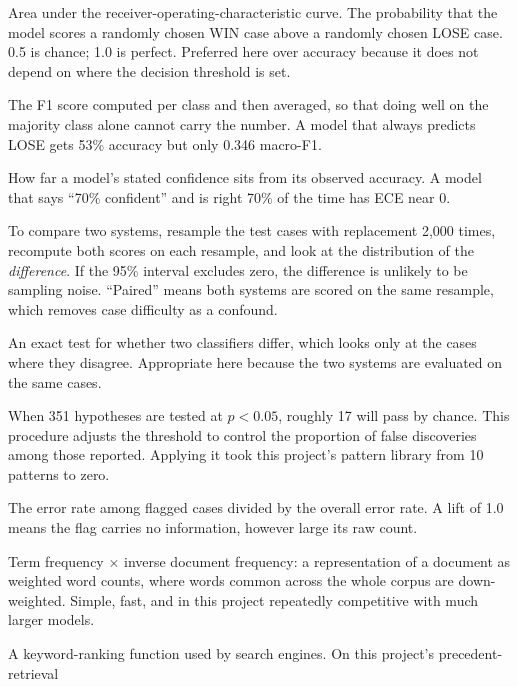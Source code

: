 \documentclass[12pt,a4paper]{article}
\begin{document}
\begin{description}[leftmargin=0pt,style=nextline,itemsep=3pt]
\item[AUROC] Area under the receiver-operating-characteristic curve. The probability that the model
scores a randomly chosen WIN case above a randomly chosen LOSE case. 0.5 is chance; 1.0 is perfect.
Preferred here over accuracy because it does not depend on where the decision threshold is set.
\item[Macro-F1] The F1 score computed per class and then averaged, so that doing well on the
majority class alone cannot carry the number. A model that always predicts LOSE gets 53\% accuracy
but only 0.346 macro-F1.
\item[ECE (expected calibration error)] How far a model's stated confidence sits from its observed
accuracy. A model that says ``70\% confident'' and is right 70\% of the time has ECE near 0.
\item[Paired bootstrap] To compare two systems, resample the test cases with replacement 2,000
times, recompute both scores on each resample, and look at the distribution of the \emph{difference}.
If the 95\% interval excludes zero, the difference is unlikely to be sampling noise. ``Paired'' means
both systems are scored on the same resample, which removes case difficulty as a confound.
\item[McNemar's test] An exact test for whether two classifiers differ, which looks only at the cases
where they disagree. Appropriate here because the two systems are evaluated on the same cases.
\item[Benjamini--Hochberg correction] When 351 hypotheses are tested at $p<0.05$, roughly 17 will pass
by chance. This procedure adjusts the threshold to control the proportion of false discoveries among
those reported. Applying it took this project's pattern library from 10 patterns to zero.
\item[Lift (base-rate control)] The error rate among flagged cases divided by the overall error rate.
A lift of 1.0 means the flag carries no information, however large its raw count.
\item[TF-IDF] Term frequency $\times$ inverse document frequency: a representation of a document as
weighted word counts, where words common across the whole corpus are down-weighted. Simple, fast,
and in this project repeatedly competitive with much larger models.
\item[BM25] A keyword-ranking function used by search engines. On this project's precedent-retrieval

\end{description}
\end{document}

